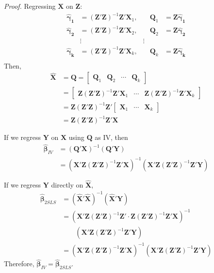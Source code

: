 \documentclass[%
 aip,
 jmp,%
 amsmath,amssymb,
 reprint,%
]{revtex4-1}
\def\b{\beta}
\def\g{\gamma}
\def\h{\hat}
\newcommand{\mat}[1]{\bm{#1}}
\renewcommand{\vec}[1]{\bm{#1}}
\begin{document}
\emph{Proof.} Regressing $\mat X$ on $\mat Z$:
\begin{align*}
  \vec{\h\g_1} &= (\mat Z'\mat Z)^{-1} \mat Z' \vec X_1, &\quad \mat Q_1 &= \mat Z\vec{\h\g_1} \\
  \vec{\h\g_2} &= (\mat Z'\mat Z)^{-1} \mat Z' \vec X_2, &\quad \mat Q_2 &= \mat Z\vec{\h\g_2} \\
  &\vdots & \vdots \\
  \vec{\h\g_k} &= (\mat Z'\mat Z)^{-1} \mat Z' \vec X_k, &\quad \mat Q_k &= \mat Z\vec{\h\g_k} \\
\end{align*}
Then,
\begin{align*}
  \mat{\h X} &= \mat Q = \begin{bmatrix}\vec Q_1 & \vec Q_2 & \cdots & \vec Q_k \end{bmatrix} \\
  &= \begin{bmatrix}\mat Z (\mat Z'\mat Z)^{-1} \mat Z' \vec X_1  & \cdots & \mat Z (\mat Z'\mat Z)^{-1} \mat Z' \vec X_k \end{bmatrix} \\
  &= \mat Z (\mat Z'\mat Z)^{-1} \mat Z'  \begin{bmatrix}\vec X_1  & \cdots & \vec X_k \end{bmatrix} \\
  &= \mat Z (\mat Z'\mat Z)^{-1} \mat Z'\mat X
\end{align*}

If we regress $\vec Y$ on $\mat X$ using $\mat Q$ as IV, then
\begin{align*}
\vec{\h\b}_{IV} &= (\mat Q'\mat X)^{-1}(\mat Q' \vec Y) \\
&= (\mat X' \mat Z (\mat Z'\mat Z)^{-1} \mat Z'\mat X)^{-1}(\mat X' \mat Z (\mat Z'\mat Z)^{-1} \mat Z' \vec Y)
\end{align*}

If we regress $\vec Y$ directly on $\mat{\h X}$,
\begin{align*}
\vec{\h\b}_{2SLS} &= (\mat{\h X}'\mat{\h X})^{-1}(\mat{\h X}' \vec Y)  \\
&= (\mat X' \mat Z (\mat Z'\mat Z)^{-1} \mat Z'\cdot \mat Z (\mat Z'\mat Z)^{-1} \mat Z'\mat X)^{-1} \\
&\qquad(\mat X' \mat Z (\mat Z'\mat Z)^{-1} \mat Z' \vec Y)\\
&= (\mat X' \mat Z (\mat Z'\mat Z)^{-1} \mat Z'\mat X)^{-1}(\mat X' \mat Z (\mat Z'\mat Z)^{-1} \mat Z' \vec Y)
\end{align*}
Therefore, $\vec{\h\b}_{IV} = \vec{\h\b}_{2SLS}$.
\end{document}
